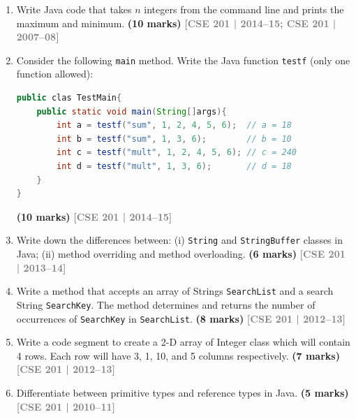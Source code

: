 \documentclass[12pt,a3paper]{article}
\newcommand{\yr}[1]{\hfill\textcolor{gray}{\small\textbf{[#1]}}}
\newcommand{\mk}[1]{\textcolor{orange!70!black}{\small\textbf{(#1 marks)}}}
\begin{document}
\begin{enumerate}



\item Write Java code that takes $n$ integers from the command line and prints the maximum and minimum. \mk{10}
\yr{CSE 201 | 2014--15; CSE 201 | 2007--08}




\item Consider the following \texttt{main} method. Write the Java function \texttt{testf} (only one function allowed):
\begin{lstlisting}[language=Java]
public clas TestMain{
    public static void main(String[]args){
        int a = testf("sum", 1, 2, 4, 5, 6);  // a = 18
        int b = testf("sum", 1, 3, 6);        // b = 10
        int c = testf("mult", 1, 2, 4, 5, 6); // c = 240
        int d = testf("mult", 1, 3, 6);       // d = 18
    }
}
\end{lstlisting}
\mk{10}
\yr{CSE 201 | 2014--15}




\item Write down the differences between: (i) \texttt{String} and \texttt{StringBuffer} classes in Java; (ii) method overriding and method overloading. \mk{6}
\yr{CSE 201 | 2013--14}

\item Write a method that accepts an array of Strings \texttt{SearchList} and a search String \texttt{SearchKey}. The method determines and returns the number of occurrences of \texttt{SearchKey} in \texttt{SearchList}. \mk{8}
\yr{CSE 201 | 2012--13}




\item Write a code segment to create a 2-D array of Integer class which will contain 4 rows. Each row will have 3, 1, 10, and 5 columns respectively. \mk{7}
\yr{CSE 201 | 2012--13}




\item Differentiate between primitive types and reference types in Java. \mk{5}
\yr{CSE 201 | 2010--11}


\end{enumerate}
\end{document}
